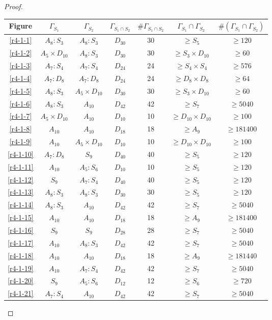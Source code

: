 \begin{proof}
\begin{table}
  \centering
  \begin{tabular}{|c|c|c|c|c|c|c|}
    \hline
    Figure & $\Gamma_{S_1}$ & $\Gamma_{S_2}$ & $\Gamma_{S_1 \cap S_2}$ & $\#\Gamma_{S_1 \cap S_2}$ & $\Gamma_{S_1} \cap \Gamma_{S_2}$ & $\#(\Gamma_{S_1} \cap \Gamma_{S_2})$ \\ \hline
    \ref{r4-1-1} & $A_8 : S_3$ & $A_8 : S_3$ & $D_{30}$ & 30 & $\ge S_5$ & $\ge 120$ \\ \hline
    \ref{r4-1-2} & $A_5 \times D_{10}$ & $A_8 : S_3$ & $D_{30}$ & 30 & $\ge S_3 \times D_{10}$ & $\ge 60$ \\ \hline
    \ref{r4-1-3} & $A_7 : S_4$ & $A_7 : S_4$ & $D_{24}$ & 24 & $\ge S_4 \times S_4$ & $\ge 576$ \\ \hline
    \ref{r4-1-4} & $A_7 : D_8$ & $A_7 : D_8$ & $D_{24}$ & 24 & $\ge D_8 \times D_8$ & $\ge 64$ \\ \hline
    \ref{r4-1-5} & $A_8 : S_3$ & $A_5 \times D_{10}$ & $D_{30}$ & 30 & $\ge S_3 \times D_{10}$ & $\ge 60$ \\ \hline
    \ref{r4-1-6} & $A_8 : S_3$ & $A_{10}$ & $D_{42}$ & 42 & $\ge S_7$ & $\ge 5040$ \\ \hline
    \ref{r4-1-7} & $A_5 \times D_{10}$ & $A_{10}$ & $D_{10}$ & 10 & $\ge D_{10} \times D_{10}$ & $\ge 100$ \\ \hline
    \ref{r4-1-8} & $A_{10}$ & $A_{10}$ & $D_{18}$ & 18 & $\ge A_9$ & $\ge 181400$ \\ \hline
    \ref{r4-1-9} & $A_{10}$ & $A_5 \times D_{10}$ & $D_{10}$ & 10 & $\ge D_{10} \times D_{10}$ & $\ge 100$ \\ \hline
    \ref{r4-1-10}& $A_7 : D_8$ & $S_9$ & $D_{40}$ & 40 & $\ge S_5$ & $\ge 120$ \\ \hline
    \ref{r4-1-11}& $A_{10}$ & $A_5 : S_6$ & $D_{10}$ & 10 & $\ge S_5$ & $\ge 120$ \\ \hline
    \ref{r4-1-12}& $S_9$ & $A_7 :S_4$ & $D_{40}$ & 40 & $\ge S_5$ & $\ge 120$ \\ \hline
    \ref{r4-1-13}& $A_8 : S_3$ & $A_8 : S_3$ & $D_{30}$ & 30 & $\ge S_5$ & $\ge 120$ \\ \hline
    \ref{r4-1-14}& $A_8 : S_3$ & $A_{10}$ & $D_{42}$ & 42 & $\ge S_7$ & $\ge 5040$ \\ \hline
    \ref{r4-1-15}& $A_{10}$ & $A_{10}$ & $D_{18}$ & 18 & $\ge A_9$ & $\ge 181400$ \\ \hline
    \ref{r4-1-16}& $S_9$ & $S_9$ & $D_{28}$ & 28 & $\ge S_7$ & $\ge 5040$ \\ \hline
    \ref{r4-1-17}& $A_{10}$ & $A_8 : S_3$ & $D_{42}$ & 42 & $\ge S_7$ & $\ge 5040$ \\ \hline
    \ref{r4-1-18}& $A_{10}$ & $A_{10}$ & $D_{18}$ & 18 & $\ge A_9$ & $\ge 181440$ \\ \hline
    \ref{r4-1-19}& $A_{10}$ & $A_7 : S_4$ & $D_{42}$ & 42 & $\ge S_7$ & $\ge 5040$ \\ \hline
    \ref{r4-1-20}& $S_9$ & $A_5 : S_6$ & $D_{12}$ & 12 & $\ge S_6$ & $\ge 720$ \\ \hline
    \ref{r4-1-21}& $A_7 : S_{4}$ & $A_{10}$ & $D_{42}$ & 42 & $\ge S_7$ & $\ge 5040$ \\ \hline


\end{tabular}
\end{table}
\end{proof}

